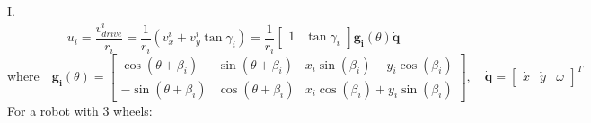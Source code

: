 \documentclass{article}
\begin{document}
\section{}
I.
\[
u_i = \frac{v^{i}_{drive}}{r_i} = \frac{1}{r_i}(v^i_x + v^i_y\tan\gamma_i) = \frac{1}{r_i}\begin{bmatrix}
    1 & \tan\gamma_i
\end{bmatrix} \bm{\mathbf{g_i}}(\theta)\bm{\mathbf{\dot{q}}}
\]
\[
\text{where} \quad \bm{\mathbf{g_i}}(\theta) = \begin{bmatrix}
    \cos(\theta + \beta_i) & \sin(\theta + \beta_i) & x_i\sin(\beta_i) - y_i\cos(\beta_i) \\ -\sin(\theta + \beta_i) & \cos(\theta + \beta_i) & x_i\cos(\beta_i) + y_i\sin(\beta_i)
\end{bmatrix}, \quad \bm{\mathbf{\dot{q}}} = \begin{bmatrix}
    \dot{x} & \dot{y} & \omega
\end{bmatrix}^T
\]
\[\]
For a robot with 3 wheels:
\end{document}
